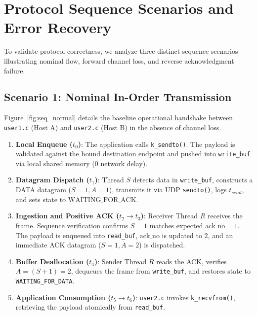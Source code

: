\documentclass[11pt,a4paper]{article}
\begin{document}
\section{Protocol Sequence Scenarios and Error Recovery}
\label{sec:sequences}

To validate protocol correctness, we analyze three distinct sequence scenarios illustrating nominal flow, forward channel loss, and reverse acknowledgment failure.

\subsection{Scenario 1: Nominal In-Order Transmission}
Figure~\ref{fig:seq_normal} details the baseline operational handshake between \texttt{user1.c} (Host A) and \texttt{user2.c} (Host B) in the absence of channel loss.
\begin{enumerate}
    \item \textbf{Local Enqueue ($t_0$)}: The application calls \texttt{k\_sendto()}. The payload is validated against the bound destination endpoint and pushed into \texttt{write\_buf} via local shared memory ($0$ network delay).
    \item \textbf{Datagram Dispatch ($t_1$)}: Thread $S$ detects data in \texttt{write\_buf}, constructs a DATA datagram ($S=1, A=1$), transmits it via UDP \texttt{sendto()}, logs $t_{send}$, and sets state to $\text{WAITING\_FOR\_ACK}$.
    \item \textbf{Ingestion and Positive ACK ($t_2 \to t_3$)}: Receiver Thread $R$ receives the frame. Sequence verification confirms $S=1$ matches expected $\text{ack\_no}=1$. The payload is enqueued into \texttt{read\_buf}, $\text{ack\_no}$ is updated to $2$, and an immediate ACK datagram ($S=1, A=2$) is dispatched.
    \item \textbf{Buffer Deallocation ($t_4$)}: Sender Thread $R$ reads the ACK, verifies $A = (S+1) = 2$, dequeues the frame from \texttt{write\_buf}, and restores state to \texttt{WAITING\_FOR\_DATA}.
    \item \textbf{Application Consumption ($t_5 \to t_6$)}: \texttt{user2.c} invokes \texttt{k\_recvfrom()}, retrieving the payload atomically from \texttt{read\_buf}.
\end{enumerate}
\end{document}
